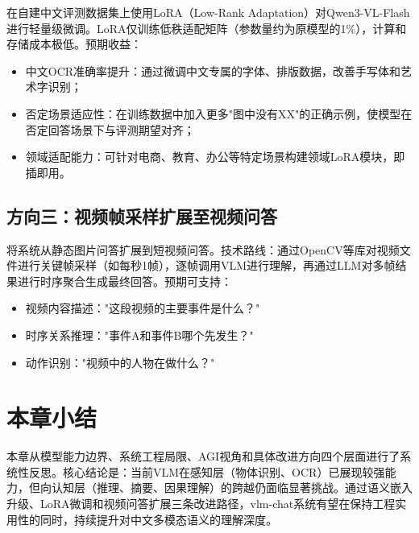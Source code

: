 在自建中文评测数据集上使用LoRA（Low-Rank Adaptation）对Qwen3-VL-Flash进行轻量级微调。LoRA仅训练低秩适配矩阵（参数量约为原模型的1\%），计算和存储成本极低。预期收益：
\begin{itemize}
  \item 中文OCR准确率提升：通过微调中文专属的字体、排版数据，改善手写体和艺术字识别；
  \item 否定场景适应性：在训练数据中加入更多"图中没有XX"的正确示例，使模型在否定回答场景下与评测期望对齐；
  \item 领域适配能力：可针对电商、教育、办公等特定场景构建领域LoRA模块，即插即用。
\end{itemize}

\subsection{方向三：视频帧采样扩展至视频问答}

将系统从静态图片问答扩展到短视频问答。技术路线：通过OpenCV等库对视频文件进行关键帧采样（如每秒1帧），逐帧调用VLM进行理解，再通过LLM对多帧结果进行时序聚合生成最终回答。预期可支持：
\begin{itemize}
  \item 视频内容描述："这段视频的主要事件是什么？"
  \item 时序关系推理："事件A和事件B哪个先发生？"
  \item 动作识别："视频中的人物在做什么？"
\end{itemize}

\section{本章小结}

本章从模型能力边界、系统工程局限、AGI视角和具体改进方向四个层面进行了系统性反思。核心结论是：当前VLM在感知层（物体识别、OCR）已展现较强能力，但向认知层（推理、摘要、因果理解）的跨越仍面临显著挑战。通过语义嵌入升级、LoRA微调和视频问答扩展三条改进路径，vlm-chat系统有望在保持工程实用性的同时，持续提升对中文多模态语义的理解深度。
